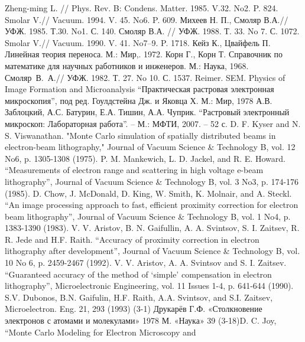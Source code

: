 \begin{thebibliography}{99}
     Zheng-ming L. // Phys. Rev. B: Condens. Matter. 1985. V.32. No2. P. 824.
     Smolar V.// Vacuum. 1994. V. 45. No6. P. 609.
     Михеев Н. П., Смоляр В.А.// УФЖ. 1985. Т.30. No1. С. 140.
     Смоляр В.А. // УФЖ. 1988. Т. 33. No 7. С. 1072.
     Smolar V.// Vacuum. 1990. V. 41. No7–9. P. 1718.
     Кейз К., Цвайфель П. Линейная теория переноса. М.: Мир,. 1972.
     Корн Г., Корн Т. Справочник по математике для научных работников и инженеров. М.: Наука, 1968.
     Смоляр~В.~А.// УФЖ. 1982. Т. 27. No 10. С. 1537.
    \bibitem{} Reimer. SEM. Physics of Image Formation and Microanalysis
    \bibitem{} ``Практическая растровая электронная микроскопия'', под ред.
Гоулдстейна Дж. и Яковца Х. М.: Мир, 1978
    \bibitem{} А.В. Заблоцкий, А.С. Батурин, Е.А. Тишин, А.А. Чуприк.
``Растровый электронный микроскоп: Лабораторная работа''. – М.:
МФТИ, 2007. – 52 с.
    \bibitem{} D. F. Kyser and N. S. Viswanathan. "Monte Carlo simulation of spatially
distributed beams in electron-beam lithography," Journal of Vacuum
Science \& Technology B, vol. 12 No6, p. 1305-1308 (1975).
    \bibitem{} P. M. Mankewich, L. D. Jackel, and R. E. Howard. ``Measurements of
electron range and scattering in high voltage e-beam lithography'',
Journal of Vacuum Science \& Technology B, vol. 3 No3, p. 174-176
(1985).
    \bibitem{} D. Chow, J. McDonald, D. King, W. Smith, K. Molnair, and A. Steckl.
``An image processing approach to fast, efficient proximity correction for
electron beam lithography'', Journal of Vacuum Science \& Technology
B, vol. 1 No4, p. 1383-1390 (1983).
    \bibitem{} V. V. Aristov, B. N. Gaifullin, A. A. Svintsov, S. I. Zaitsev, R. R. Jede
and H.F. Raith. ``Accuracy of proximity correction in electron
lithography after development'', Journal of Vacuum Science \&
Technology B, vol. 10 No 6, p. 2459-2467 (1992).
    \bibitem{} V. V. Aristov, A. A. Svintsov and S. I. Zaitsev. ``Guaranteed accuracy of
the method of ‘simple’ compensation in electron lithography'',
Microelectronic Engineering, vol. 11 Issues 1-4, p. 641-644 (1990).
    \bibitem{} S.V. Dubonos, B.N. Gaifulin, H.F. Raith, A.A. Svintsov, and S.I. Zaitsev,
Microelectron. Eng. 21, 293 (1993)
    \bibitem{} (3-1) Друкарёв Г.Ф. «Столкновение электронов с атомами и
молекулами» 1978 М. «Наука»
39
    \bibitem{} (3-18)D. C. Joy, ``Monte Carlo Modeling for Electron Microscopy and

\end{thebibliography}
